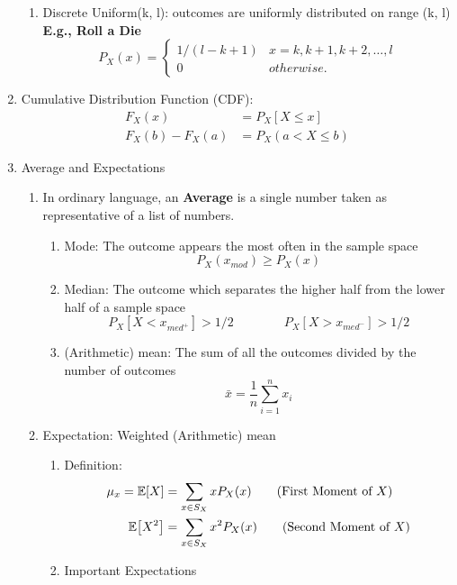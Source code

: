 \begin{enumerate}
{\begin{enumerate}
{            }
            \item Discrete Uniform(k, l): outcomes are uniformly distributed on range (k, l) \textbf{E.g., Roll a Die}{
                \[ P_X(x) = 
                \begin{cases}
                    1/(l-k+1)   & x=k,k+1,k+2,\ldots,l \\
                    0   & otherwise.
                \end{cases} \]
            }            
        \end{enumerate}
    }
    \item Cumulative Distribution Function (CDF): {
        \begin{align*}
            F_X(x)&=P_X[X\leq x] \\
            F_X(b)-F_X(a)&=P_X(a<X\leq b)
        \end{align*}
    }
    \item Average and Expectations{
        \begin{enumerate}
            \item In ordinary language, an \textbf{Average} is a single number taken as representative of a list of numbers.{
            \begin{enumerate}
                \item Mode: The outcome appears the most often in the sample space \[P_X(x_{mod})\geq P_X(x)\]
                \item Median: The outcome which separates the higher half from  the lower half of a sample space \[P_X[X < x_{med^+}] > 1/2 \qquad \qquad P_X[X > x_{med^-}] > 1/2\]
                \item (Arithmetic) mean:  The sum of all the outcomes divided by the number of outcomes \[\bar{x} = \frac{1}{n}\sum_{i=1}^{n}x_i\]
            \end{enumerate}
            }
            \item Expectation: Weighted (Arithmetic) mean{
                \begin{enumerate}
                    \item Definition:{
                        \begin{align}
                            \mu_x = \E{X}&=\sum_{x\in S_X}xP_X(x) \tag{First Moment of $X$}\\
                            \E{X^2}&=\sum_{x\in S_X}x^2P_X(x) \tag{Second Moment of $X$}
                        \end{align}
                    }
                    \item Important Expectations{
}
\end{enumerate}}
\end{enumerate}}
\end{enumerate}
